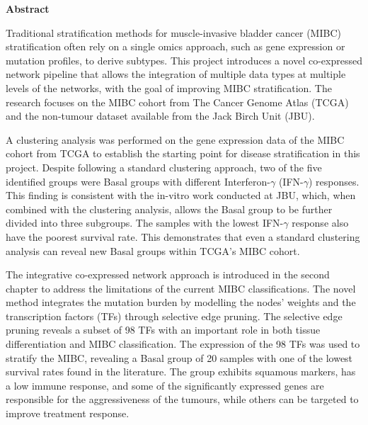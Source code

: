 \thispagestyle{plain}
\begin{center}
    \Large        
    \textbf{Abstract}
    \vspace{0.2cm}
\end{center}


Traditional stratification methods for muscle-invasive bladder cancer (MIBC) stratification often rely on a single omics approach, such as gene expression or mutation profiles, to derive subtypes. This project introduces a novel co-expressed network pipeline that allows the integration of multiple data types at multiple levels of the networks, with the goal of improving MIBC stratification. The research focuses on the MIBC cohort from The Cancer Genome Atlas (TCGA) and the non-tumour dataset available from the Jack Birch Unit (JBU).

A clustering analysis was performed on the gene expression data of the MIBC cohort from TCGA to establish the starting point for disease stratification in this project. Despite following a standard clustering approach, two of the five identified groups were Basal groups with different Interferon-$\gamma$ (IFN-$\gamma$) responses. This finding is consistent with the in-vitro work conducted at JBU, which, when combined with the clustering analysis, allows the Basal group to be further divided into three subgroups. The samples with the lowest IFN-$\gamma$ response also have the poorest survival rate. This demonstrates that even a standard clustering analysis can reveal new Basal groups within TCGA's MIBC cohort.


% 
The integrative co-expressed network approach is introduced in the second chapter to address the limitations of the current MIBC classifications. The novel method integrates the mutation burden by modelling the nodes' weights and the transcription factors (TFs) through selective edge pruning. The selective edge pruning reveals a subset of 98 TFs with an important role in both tissue differentiation and MIBC classification. The expression of the 98 TFs was used to stratify the MIBC, revealing a Basal group of 20 samples with one of the lowest survival rates found in the literature. The group exhibits squamous markers, has a low immune response, and some of the significantly expressed genes are responsible for the aggressiveness of the tumours, while others can be targeted to improve treatment response.

